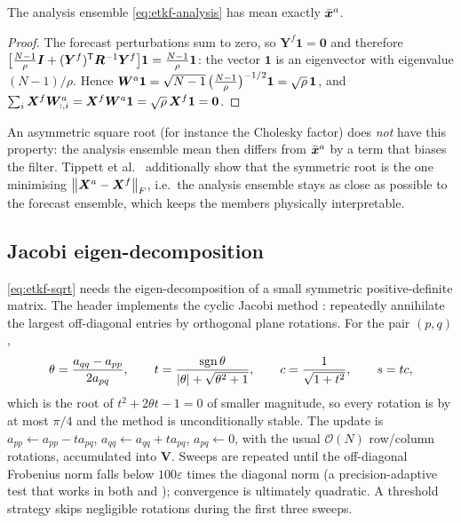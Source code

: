\begin{proposition}
The analysis ensemble \eqref{eq:etkf-analysis} has mean exactly $\bar{\bm{x}}^a$.
\end{proposition}
\begin{proof}
The forecast perturbations sum to zero, so $\bm{Y}^f\bm 1 = \bm 0$ and therefore
$\big[\frac{N-1}{\rho}\bm{I} + (\bm{Y}^f)^{\mathsf{T}}\bm{R}^{-1}\bm{Y}^f\big]\bm 1 = \frac{N-1}{\rho}\bm 1$: the vector
$\bm 1$ is an eigenvector with eigenvalue $(N-1)/\rho$.  Hence
$\bm{W}^a\bm 1 = \sqrt{N-1}\,\big(\tfrac{N-1}{\rho}\big)^{-1/2}\bm 1 = \sqrt{\rho}\,\bm 1$, and
$\sum_i \bm{X}^f\bm{W}^a_{:,i} = \bm{X}^f\bm{W}^a\bm 1 = \sqrt\rho\,\bm{X}^f\bm 1 = \bm 0$.
\end{proof}
\noindent An asymmetric square root (for instance the Cholesky factor) does \emph{not} have this
property: the analysis ensemble mean then differs from $\bar{\bm{x}}^a$ by a term that biases the
filter.  Tippett et al.\ \cite{tippett2003srf} additionally show that the symmetric root is the
one minimising $\left\lVert \bm{X}^a - \bm{X}^f \right\rVert_F$, i.e.\ the analysis ensemble stays as close as possible to
the forecast ensemble, which keeps the members physically interpretable.

\subsection{Jacobi eigen-decomposition}
\eqref{eq:etkf-sqrt} needs the eigen-decomposition of a small symmetric positive-definite matrix.
The header implements the cyclic Jacobi method \cite[\S8.5]{golubvanloan2013}: repeatedly annihilate
the largest off-diagonal entries by orthogonal plane rotations.  For the pair $(p,q)$,
\begin{equation}
  \theta = \frac{a_{qq}-a_{pp}}{2a_{pq}}, \qquad
  t = \frac{\operatorname{sgn}\theta}{|\theta| + \sqrt{\theta^2+1}}, \qquad
  c = \frac{1}{\sqrt{1+t^2}}, \qquad s = t c,
  \label{eq:etkf-jacobi}
\end{equation}
which is the root of $t^2 + 2\theta t - 1 = 0$ of smaller magnitude, so every rotation is by at
most $\pi/4$ and the method is unconditionally stable.  The update is
$a_{pp}\leftarrow a_{pp}-t a_{pq}$, $a_{qq}\leftarrow a_{qq}+ta_{pq}$, $a_{pq}\leftarrow 0$, with
the usual $\mathcal{O}(N)$ row/column rotations, accumulated into $\bm{V}$.  Sweeps are repeated until
the off-diagonal Frobenius norm falls below $100\varepsilon$ times the diagonal norm (a
precision-adaptive test that works in both  and ); convergence is
ultimately quadratic.  A threshold strategy skips negligible rotations during the first three
sweeps.

